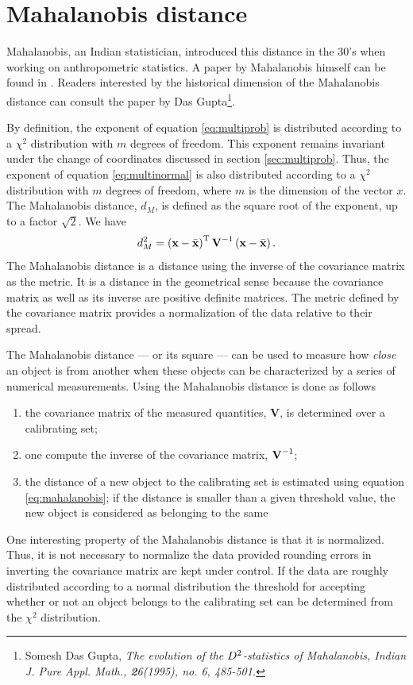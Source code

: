 \section{Mahalanobis distance}
\label{sec:mahalanobis} Mahalanobis, an Indian statistician,
introduced this distance in the 30's when working on
anthropometric statistics. A paper by Mahalanobis himself can be
found in \cite{AtchBry}. Readers interested by the historical
dimension of the Mahalanobis distance can consult the paper by Das
Gupta\footnote{Somesh Das Gupta, \em{The evolution of the $D\sp
2$-statistics of Mahalanobis}, Indian J. Pure Appl. Math., {\textbf
26}(1995), no. 6, 485-501.}.

By definition, the exponent of equation \ref{eq:multiprob} is
distributed according to a $\chi^2$ distribution with $m$ degrees
of freedom. This exponent remains invariant under the change of
coordinates discussed in section \ref{sec:multiprob}. Thus, the
exponent of equation \ref{eq:multinormal} is also distributed
according to a $\chi^2$ distribution with $m$ degrees of freedom,
where $m$ is the dimension of the vector $x$. The Mahalanobis
distance, $d_M$, is defined as the square root of the exponent, up
to a factor $\sqrt{2}$. We have
\begin{equation}
\label{eq:mahalanobis} d^2_M = \left({\textbf x}-\bar{{\textbf
x}}\right)^{\mathop{\textrm T}} \textbf{V}^{-1}\left({\textbf x}-\bar{{\textbf
x}}\right).
\end{equation}
The Mahalanobis distance is a distance using the inverse of the
covariance matrix as the metric. It is a distance in the
geometrical sense because the covariance matrix as well as its
inverse are positive definite matrices. The metric defined by the
covariance matrix provides a normalization of the data relative to
their spread.

The Mahalanobis distance --- or its square --- can be used to
measure how \textsl{close} an object is from another when these
objects can be characterized by a series of numerical
measurements. Using the Mahalanobis distance is done as follows
\begin{enumerate}
  \item the covariance matrix of the measured quantities, $\textbf{V}$, is
determined over a calibrating set;
  \item one compute the inverse of the covariance matrix,
  $\textbf{V}^{-1}$;
  \item the distance of a new object to the calibrating set is
  estimated using equation \ref{eq:mahalanobis}; if the distance
  is smaller than a given threshold value, the new object is
  considered as belonging to the same
\end{enumerate}
One interesting property of the Mahalanobis distance is that it is
normalized. Thus, it is not necessary to normalize the data
provided rounding errors in inverting the covariance matrix are
kept under control. If the data are roughly distributed according
to a normal distribution the threshold for accepting whether or
not an object belongs to the calibrating set can be determined
from the $\chi^2$ distribution.

